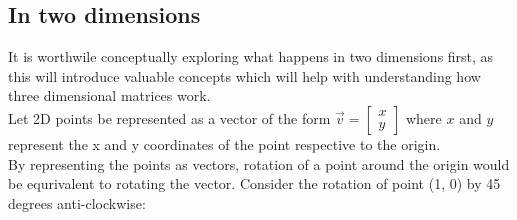 \documentclass[12pt, a4paper]{article}
\begin{document}
\subsection{In two dimensions}
It is worthwile conceptually exploring what happens in two dimensions first, as
this will introduce valuable concepts which will help with understanding how
three dimensional matrices work. \\

Let 2D points be represented as a vector of the form $\vec{v} = \begin{bmatrix}x
\\ y \end{bmatrix}$ where $x$ and $y$ represent the x and y coordinates of the
point respective to the origin. \\

By representing the points as vectors, rotation of a point around the origin
would be equrivalent to rotating the vector. Consider the rotation of point (1,
0) by 45 degrees anti-clockwise:
\end{document}

